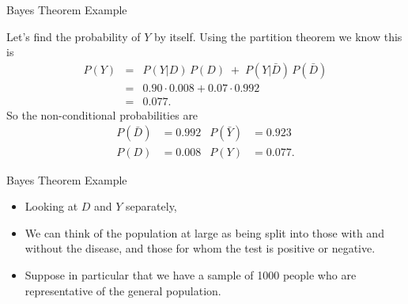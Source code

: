 \begin{frame}{Bayes Theorem  Example }

Let's find the probability
of $Y$ by itself.  Using the partition theorem we know this is
\begin{eqnarray*}
	P(Y) &=& P(Y|D)\,P(D) \;+\; P(Y|\bar{D})\,P(\bar{D}) \\
	&=& 0.90 \cdot 0.008 + 0.07\cdot 0.992 \\
	&=& 0.077.
\end{eqnarray*}
So the non-conditional probabilities are
\begin{align*}
	P(\bar{D})  &= 0.992  & P(\bar{Y})  &= 0.923 \\
	P(D)      &= 0.008  & P(Y)      &= 0.077.
\end{align*}
\end{frame}

\begin{frame}{Bayes Theorem  Example }

\begin{itemize}
\item   Looking at $D$ and $Y$ separately, 
\item We can think of the population at large as
being split into those with and without the disease, and those for whom the
test is positive or negative.  
\item Suppose in particular that we have a sample of
1000 people who are representative of the general population. 
\end{itemize}
\end{frame}



